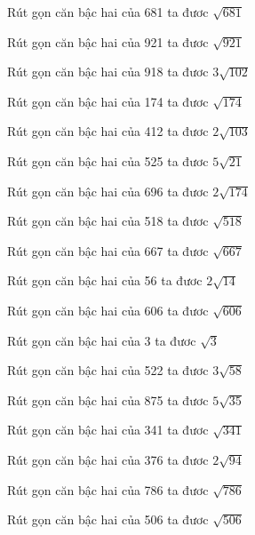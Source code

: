 \documentclass[12pt,a4paper]{article}
\begin{document}
\begin{ex}
Rút gọn căn bậc hai của 681 ta đươc $\sqrt{681}$
\end{ex}
\begin{ex}
Rút gọn căn bậc hai của 921 ta đươc $\sqrt{921}$
\end{ex}
\begin{ex}
Rút gọn căn bậc hai của 918 ta đươc $3\sqrt{102}$
\end{ex}
\begin{ex}
Rút gọn căn bậc hai của 174 ta đươc $\sqrt{174}$
\end{ex}
\begin{ex}
Rút gọn căn bậc hai của 412 ta đươc $2\sqrt{103}$
\end{ex}
\begin{ex}
Rút gọn căn bậc hai của 525 ta đươc $5\sqrt{21}$
\end{ex}
\begin{ex}
Rút gọn căn bậc hai của 696 ta đươc $2\sqrt{174}$
\end{ex}
\begin{ex}
Rút gọn căn bậc hai của 518 ta đươc $\sqrt{518}$
\end{ex}
\begin{ex}
Rút gọn căn bậc hai của 667 ta đươc $\sqrt{667}$
\end{ex}
\begin{ex}
Rút gọn căn bậc hai của 56 ta đươc $2\sqrt{14}$
\end{ex}
\begin{ex}
Rút gọn căn bậc hai của 606 ta đươc $\sqrt{606}$
\end{ex}
\begin{ex}
Rút gọn căn bậc hai của 3 ta đươc $\sqrt{3}$
\end{ex}
\begin{ex}
Rút gọn căn bậc hai của 522 ta đươc $3\sqrt{58}$
\end{ex}
\begin{ex}
Rút gọn căn bậc hai của 875 ta đươc $5\sqrt{35}$
\end{ex}
\begin{ex}
Rút gọn căn bậc hai của 341 ta đươc $\sqrt{341}$
\end{ex}
\begin{ex}
Rút gọn căn bậc hai của 376 ta đươc $2\sqrt{94}$
\end{ex}
\begin{ex}
Rút gọn căn bậc hai của 786 ta đươc $\sqrt{786}$
\end{ex}
\begin{ex}
Rút gọn căn bậc hai của 506 ta đươc $\sqrt{506}$
\end{ex}
\end{document}
